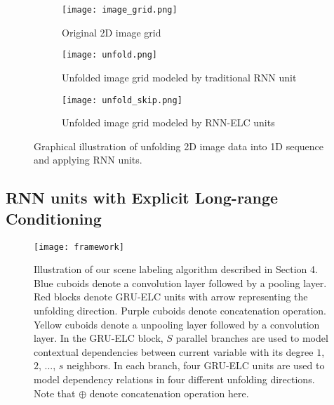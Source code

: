 \documentclass[10pt,twocolumn,letterpaper]{article}
\begin{document}
 \begin{figure}[t]
\centering
\begin{subfigure}{.47\textwidth}
  \centering
  \texttt{[image: image\_grid.png]}
  \caption{Original 2D image grid}
    \label{fig:image_grid}
\end{subfigure}%


\begin{subfigure}{.47\textwidth}
  \centering
  \texttt{[image: unfold.png]}
  \caption{Unfolded image grid modeled by traditional RNN unit}
  \label{fig:unfold}
\end{subfigure}


\begin{subfigure}{.47\textwidth}
  \centering
  \texttt{[image: unfold\_skip.png]}
  \caption{Unfolded image grid modeled by RNN-ELC units}
      \label{fig:unfold_skip}
\end{subfigure}


   \caption{Graphical illustration of unfolding 2D image data into 1D sequence and applying RNN units.}
\label{fig:long}
\end{figure}





\subsection{RNN units with Explicit Long-range Conditioning}

\begin{figure}
\begin{center}
   \texttt{[image: framework]}
\end{center}
   \caption{Illustration of our scene labeling algorithm described in Section 4. Blue cuboids denote a convolution layer followed by a pooling layer. Red blocks denote GRU-ELC units with arrow representing the unfolding direction. Purple cuboids denote concatenation operation. Yellow cuboids denote a unpooling layer followed by a convolution layer. In the GRU-ELC block, $S$ parallel branches are used to model contextual dependencies between current variable with its degree $1$, $2$, ..., $s$ neighbors. In each branch, four GRU-ELC units are used to model dependency relations in four different unfolding directions. Note that $\oplus$ denote concatenation operation here.}
\label{fig:frame}
\end{figure}
\end{document}

